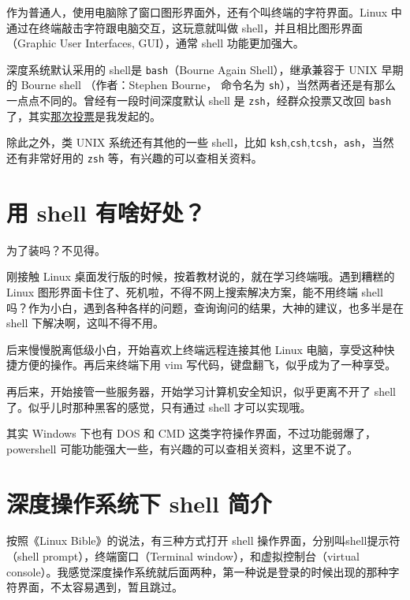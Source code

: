 \documentclass[doctor,openright,twoside]{sjtuthesis}
\newcommand{\passthrough}[1]{#1}
\theoremstyle{plain}
\theoremstyle{definition}
\theoremstyle{remark}
\theoremstyle{ocrenumbox}
\theoremstyle{plain}
\begin{document}
作为普通人，使用电脑除了窗口图形界面外，还有个叫终端的字符界面。Linux
中通过在终端敲击字符跟电脑交互，这玩意就叫做
shell，并且相比图形界面（Graphic User Interfaces, GUI），通常 shell
功能更加强大。

深度系统默认采用的 shell是
\passthrough{\lstinline!bash!}（Bourne Again Shell），继承兼容于 UNIX
早期的 Bourne shell （作者：Stephen Bourne， 命令名为
\passthrough{\lstinline!sh!}），当然两者还是有那么一点点不同的。曾经有一段时间深度默认
shell 是 \passthrough{\lstinline!zsh!}，经群众投票又改回
\passthrough{\lstinline!bash!}了，其实\href{https://bbs.deepin.org/forum.php?mod=viewthread\&tid=30976\&extra=}{那次投票}是我发起的。

除此之外，类 UNIX 系统还有其他的一些 shell，比如
\passthrough{\lstinline!ksh!},\passthrough{\lstinline!csh!},\passthrough{\lstinline!tcsh!}，\passthrough{\lstinline!ash!}，当然还有非常好用的
\passthrough{\lstinline!zsh!} 等，有兴趣的可以查相关资料。

\hypertarget{-shell-}{%
\section{用 shell 有啥好处？}\label{-shell-}}

为了装吗？不见得。

刚接触 Linux 桌面发行版的时候，按着教材说的，就在学习终端哦。遇到糟糕的
Linux 图形界面卡住了、死机啦，不得不网上搜索解决方案，能不用终端 shell
吗？作为小白，遇到各种各样的问题，查询询问的结果，大神的建议，也多半是在
shell 下解决啊，这叫不得不用。

后来慢慢脱离低级小白，开始喜欢上终端远程连接其他 Linux
电脑，享受这种快捷方便的操作。再后来终端下用 vim
写代码，键盘翻飞，似乎成为了一种享受。

再后来，开始接管一些服务器，开始学习计算机安全知识，似乎更离不开了 shell
了。似乎儿时那种黑客的感觉，只有通过 shell 才可以实现哦。

其实 Windows 下也有 DOS 和 CMD 这类字符操作界面，不过功能弱爆了，
powershell 可能功能强大一些，有兴趣的可以查相关资料，这里不说了。

\hypertarget{shell:intro}{%
\section{深度操作系统下 shell 简介}\label{shell:intro}}

按照《Linux Bible》的说法，有三种方式打开 shell
操作界面，分别叫shell提示符（shell
prompt），终端窗口（Terminal
window），和虚拟控制台（virtual
console）。我感觉深度操作系统就后面两种，第一种说是登录的时候出现的那种字符界面，不太容易遇到，暂且跳过。
\end{document}
